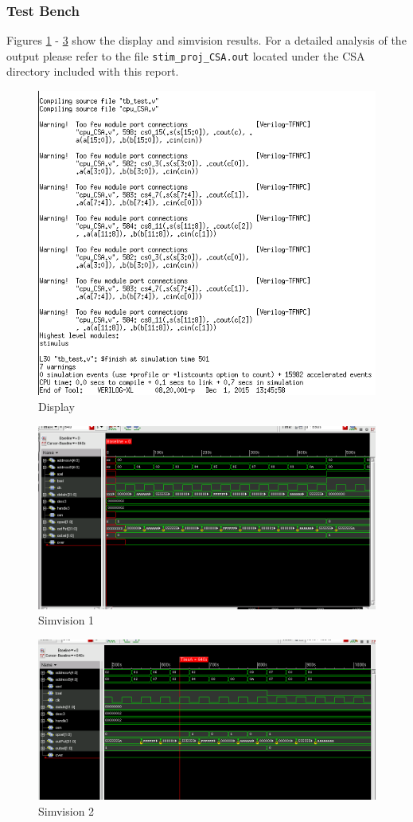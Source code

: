 \documentclass[12pt]{article}
\begin{document}
\subsubsection{Test Bench}
Figures \ref{fig:test-text-CSA} - \ref{fig:test2-test-CSA} show the display and simvision results. For a detailed analysis of the output please refer to the file \texttt{stim\_proj\_CSA.out} located under the CSA directory included with this report.
\begin{figure}[H]
\centering
\includegraphics[width=.7\linewidth]{../CSA/tbtest-text}
\caption{Display}
\label{fig:test-text-CSA}
\end{figure}
\begin{figure}[H]
\centering
\includegraphics[width=\linewidth]{../CSA/test1}
\caption{Simvision 1}
\label{fig:test1-test-CS}
\end{figure}
\begin{figure}[H]
\centering
\includegraphics[width=\linewidth]{../CSA/test2}
\caption{Simvision 2}
\label{fig:test2-test-CSA}
\end{figure}
\end{document}
